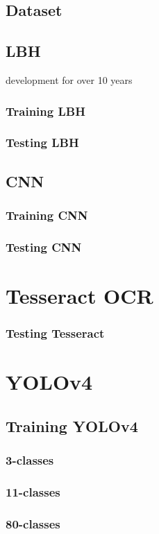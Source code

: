 {\subsection{Dataset}

\subsection{LBH}
development for over 10 years
\subsubsection{Training LBH}
\subsubsection{Testing LBH}

\subsection{CNN}
\subsubsection{Training CNN}
\subsubsection{Testing CNN}
\section{Tesseract OCR}
\subsubsection{Testing Tesseract}
\section{YOLOv4}
\subsection{Training YOLOv4}
\subsubsection{3-classes}
\subsubsection{11-classes}
\subsubsection{80-classes}
}
